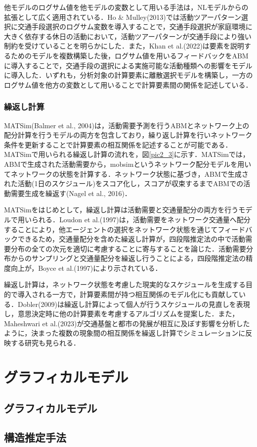 他モデルのログサム値を他モデルの変数として用いる手法は，NLモデルからの拡張として広く適用されている．Ho \& Mulley(2013)では活動ツアーパターン選択に交通手段選択のログサム変数を導入することで，交通手段選択が家庭環境に大きく依存する休日の活動において，活動ツアーパターンが交通手段により強い制約を受けていることを明らかにした．また，Khan et al.(2022)は要素を説明するためのモデルを複数構築した後，ログサム値を用いるフィードバックをABMに導入することで，交通手段の選択による実施可能な活動種類への影響をモデルに導入した．いずれも，分析対象の計算要素に離散選択モデルを構築し，一方のログサム値を他方の変数として用いることで計算要素間の関係を記述している．

\subsubsection{繰返し計算}
MATSim(Balmer et al., 2004)は，活動需要予測を行うABMとネットワーク上の配分計算を行うモデルの両方を包含しており，繰り返し計算を行いネットワーク条件を更新することで計算要素の相互関係を記述することが可能である．MATSimで用いられる繰返し計算の流れを，図\ref{pic2_3}に示す．MATSimでは，ABMで生成された活動需要から，mobsimというネットワーク配分モデルを用いてネットワークの状態を計算する．ネットワーク状態に基づき，ABMで生成された活動(1日のスケジュール)をスコア化し，スコアが収束するまでABMでの活動需要生成を繰返す(Nagel et al., 2016)．

MATSimをはじめとして，繰返し計算は活動需要と交通量配分の両方を行うモデルで用いられる．Loudon et al.(1997)は，活動需要をネットワーク交通量へ配分することにより，他エージェントの選択をネットワーク状態を通じてフィードバックできるため，交通量配分を含めた繰返し計算が，四段階推定法の中で活動需要分布の全ての次元を適切に考慮することに寄与することを論じた．活動需要分布からのサンプリングと交通量配分を繰返し行うことによる，四段階推定法の精度向上が，Boyce et al.(1997)により示されている．

繰返し計算は，ネットワーク状態を考慮した現実的なスケジュールを生成する目的で導入される一方で，計算要素間が持つ相互関係のモデル化にも貢献している．Dobler(2009)は繰返し計算によって個人が行うスケジュールの見直しを表現し，意思決定時に他の計算要素を考慮するアルゴリズムを提案した．また，Maheshwari et al.(2023)が交通基盤と都市の発展が相互に及ぼす影響を分析したように，決まった複数の現象間の相互関係を繰返し計算でシミュレーションに反映する研究も見られる．




\section{グラフィカルモデル}\label{2.3}

\subsection{グラフィカルモデル}\label{2.3.1}

\subsection{構造推定手法}\label{2.3.2}